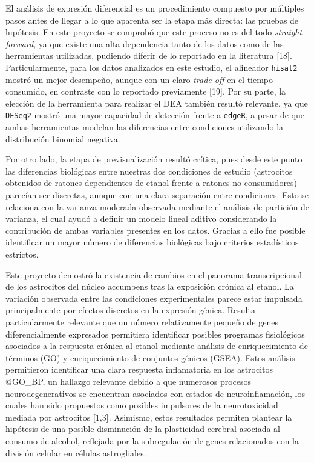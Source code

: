 \documentclass[
  9pt,
]{article}
\begin{document}
El análisis de expresión diferencial es un procedimiento compuesto por
múltiples pasos antes de llegar a lo que aparenta ser la etapa más
directa: las pruebas de hipótesis. En este proyecto se comprobó que este
proceso no es del todo \emph{straight-forward}, ya que existe una alta
dependencia tanto de los datos como de las herramientas utilizadas,
pudiendo diferir de lo reportado en la literatura {[}18{]}.
Particularmente, para los datos analizados en este estudio, el alineador
\texttt{hisat2} mostró un mejor desempeño, aunque con un claro
\emph{trade-off} en el tiempo consumido, en contraste con lo reportado
previamente {[}19{]}. Por su parte, la elección de la herramienta para
realizar el DEA también resultó relevante, ya que \texttt{DESeq2} mostró
una mayor capacidad de detección frente a \texttt{edgeR}, a pesar de que
ambas herramientas modelan las diferencias entre condiciones utilizando
la distribución binomial negativa.

Por otro lado, la etapa de previsualización resultó crítica, pues desde
este punto las diferencias biológicas entre nuestras dos condiciones de
estudio (astrocitos obtenidos de ratones dependientes de etanol frente a
ratones no consumidores) parecían ser discretas, aunque con una clara
separación entre condiciones. Esto se relaciona con la varianza moderada
observada mediante el análisis de partición de varianza, el cual ayudó a
definir un modelo lineal aditivo considerando la contribución de ambas
variables presentes en los datos. Gracias a ello fue posible identificar
un mayor número de diferencias biológicas bajo criterios estadísticos
estrictos.

Este proyecto demostró la existencia de cambios en el panorama
transcripcional de los astrocitos del núcleo accumbens tras la
exposición crónica al etanol. La variación observada entre las
condiciones experimentales parece estar impulsada principalmente por
efectos discretos en la expresión génica. Resulta particularmente
relevante que un número relativamente pequeño de genes diferencialmente
expresados permitiera identificar posibles programas fisiológicos
asociados a la respuesta crónica al etanol mediante análisis de
enriquecimiento de términos (GO) y enriquecimiento de conjuntos génicos
(GSEA). Estos análisis permitieron identificar una clara respuesta
inflamatoria en los astrocitos @GO\_BP, un hallazgo relevante debido a
que numerosos procesos neurodegenerativos se encuentran asociados con
estados de neuroinflamación, los cuales han sido propuestos como
posibles impulsores de la neurotoxicidad mediada por astrocitos
{[}1,3{]}. Asimismo, estos resultados permiten plantear la hipótesis de
una posible disminución de la plasticidad cerebral asociada al consumo
de alcohol, reflejada por la subregulación de genes relacionados con la
división celular en células astrogliales.
\end{document}
